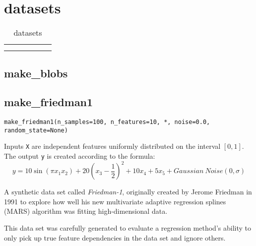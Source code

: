 \chapter{datasets\label{datasets}}
\begin{table}
    \centering
    \caption{datasets}
    \begin{tabular}{llllll}
        \hline
        \nameref{fetch20newsgroups} & \nameref{fetchlfwpeople} & \nameref{makefriedman1} & \nameref{makefriedman2} & \nameref{makefriedman3} & \nameref{makecircles} \\
        \nameref{makeblobs}         &                                                                                                                                \\
        \hline
    \end{tabular}
\end{table}
\section{make\_blobs\label{makeblobs}}
\section{make\_friedman1\label{makefriedman1}}
\verb|make_friedman1(n_samples=100, n_features=10, *, noise=0.0, random_state=None)|

Inputs \verb|X| are independent features uniformly distributed on the interval $[0, 1]$. The output \verb|y| is created according to the formula:
\begin{equation}
    y = 10\sin(\pi x_1x_2)+20(x_3-\frac{1}{2})^2+10x_4+5x_5+Gaussian~Noise(0,\sigma)
\end{equation}

A synthetic data set called \textit{Friedman-1}, originally created by Jerome Friedman in 1991 to explore how well his new multivariate adaptive regression splines
(MARS) algorithm was fitting high-dimensional data.

This data set was carefully generated to evaluate a regression method's ability to
only pick up true feature dependencies in the data set and ignore others.

